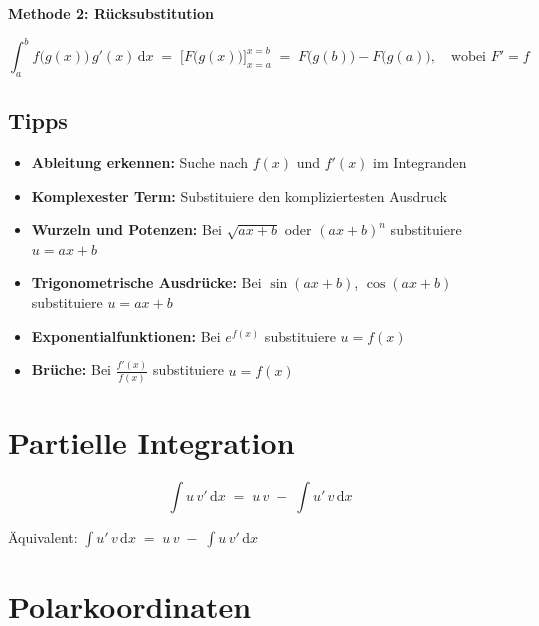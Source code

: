 \documentclass[a4paper,11pt,oneside,open=any,parskip=half, DIV=15]{scrreprt}
\begin{document}
      \textbf{Methode 2: Rücksubstitution}
      \begin{importantbox}
         \[
            \int_{a}^{b} f\bigl(g(x)\bigr)\,g'(x)\,\mathrm{d}x
            \;=\;
            \bigl[F\bigl(g(x)\bigr)\bigr]_{x=a}^{x=b}
            \;=\; F\bigl(g(b)\bigr)-F\bigl(g(a)\bigr),
            \quad \text{wobei } F' = f
         \]
      \end{importantbox}

   \subsection*{Tipps}

      \begin{itemize}
         \item \textbf{Ableitung erkennen:} Suche nach \(f(x)\) und \(f'(x)\) im Integranden
         \item \textbf{Komplexester Term:} Substituiere den kompliziertesten Ausdruck
         \item \textbf{Wurzeln und Potenzen:} Bei \(\sqrt{ax+b}\) oder \((ax+b)^n\) substituiere \(u = ax+b\)
         \item \textbf{Trigonometrische Ausdrücke:} Bei \(\sin(ax+b)\), \(\cos(ax+b)\) substituiere \(u = ax+b\)
         \item \textbf{Exponentialfunktionen:} Bei \(e^{f(x)}\) substituiere \(u = f(x)\)
         \item \textbf{Brüche:} Bei \(\frac{f'(x)}{f(x)}\) substituiere \(u = f(x)\)
      \end{itemize}

\section{Partielle Integration} 

   \begin{importantbox}
      \[
         \int u\,v'\,\mathrm{d}x \;=\; u\,v \;-\; \int u'\,v\,\mathrm{d}x
      \] 
   \end{importantbox}

Äquivalent: \(\displaystyle \int u'\,v\,\mathrm{d}x \;=\; u\,v \;-\; \int u\,v'\,\mathrm{d}x\)


\section{Polarkoordinaten}
\end{document}
